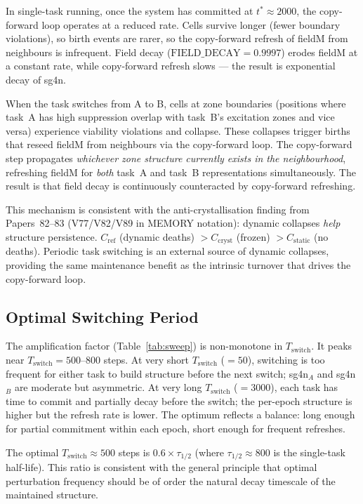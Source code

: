 \documentclass[11pt]{article}
\begin{document}
In single-task running, once the system has committed at $t^* \approx 2000$, the
copy-forward loop operates at a reduced rate.
Cells survive longer (fewer boundary violations), so birth events are rarer, so
the copy-forward refresh of fieldM from neighbours is infrequent.
Field decay ($\mathrm{FIELD\_DECAY} = 0.9997$) erodes fieldM at a constant rate,
while copy-forward refresh slows --- the result is exponential decay of sg4n.

When the task switches from A to B, cells at zone boundaries (positions where task~A
has high suppression overlap with task~B's excitation zones and vice versa) experience
viability violations and collapse.
These collapses trigger births that reseed fieldM from neighbours via the copy-forward
loop.
The copy-forward step propagates \emph{whichever zone structure currently exists in
the neighbourhood}, refreshing fieldM for \emph{both} task~A and task~B representations
simultaneously.
The result is that field decay is continuously counteracted by copy-forward refreshing.

This mechanism is consistent with the anti-crystallisation finding from Papers~82--83
(V77/V82/V89 in MEMORY notation):
dynamic collapses \emph{help} structure persistence.
$C_\mathrm{ref}$ (dynamic deaths) $> C_\mathrm{cryst}$ (frozen) $> C_\mathrm{static}$
(no deaths).
Periodic task switching is an external source of dynamic collapses, providing the same
maintenance benefit as the intrinsic turnover that drives the copy-forward loop.

\subsection{Optimal Switching Period}

The amplification factor (Table~\ref{tab:sweep}) is non-monotone in $T_\mathrm{switch}$.
It peaks near $T_\mathrm{switch} = 500$--$800$ steps.
At very short $T_\mathrm{switch}$ ($= 50$), switching is too frequent for either task
to build structure before the next switch; sg4n$_A$ and sg4n$_B$ are moderate but
asymmetric.
At very long $T_\mathrm{switch}$ ($= 3000$), each task has time to commit and partially
decay before the switch; the per-epoch structure is higher but the refresh rate is lower.
The optimum reflects a balance: long enough for partial commitment within each epoch,
short enough for frequent refreshes.

The optimal $T_\mathrm{switch} \approx 500$ steps is $0.6 \times \tau_{1/2}$ (where
$\tau_{1/2} \approx 800$ is the single-task half-life).
This ratio is consistent with the general principle that optimal perturbation
frequency should be of order the natural decay timescale of the maintained structure.
\end{document}

